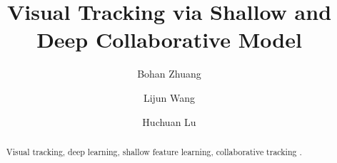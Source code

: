 \documentclass[preprint,12pt,review]{elsarticle}
\begin{document}
\begin{frontmatter}



\title{Visual Tracking via Shallow and Deep Collaborative Model}

\author{Bohan Zhuang}



\author{Lijun Wang}

\author{Huchuan Lu}
\address{School of Information and Communication Engineering,
	Dalian University of Technology, Dalian, 116023, China}


\begin{abstract}
	
\begin{keyword}
Visual tracking, deep learning, shallow feature learning, collaborative tracking . 
\end{keyword}


\end{abstract}
\end{frontmatter}
\end{document}
